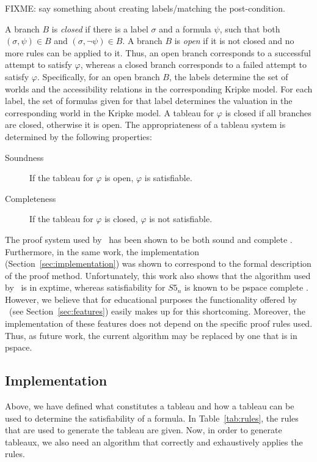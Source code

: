 FIXME: say something about creating labels/matching the post-condition.

A branch $B$ is {\em closed} if there is a label $\sigma$ and a formula
$\psi$, such that both $(\sigma, \psi) \in B$ and $(\sigma, \neg \psi)
\in B$. A branch $B$ is {\em open} if it is not closed and no more rules can be
applied to it. Thus, an open branch corresponds to a successful attempt to
satisfy $\varphi$, whereas a closed branch corresponds to a failed attempt to
satisfy $\varphi$. 
Specifically, for an open branch $B$, the labels determine the set of worlds
and the accessibility relations in the corresponding Kripke model. For each
label, the set of formulas given for that label determines the valuation in the
corresponding world in the Kripke model.
A tableau for $\varphi$ is closed if all branches are
closed, otherwise it is open. The appropriateness of a tableau system is
determined by the following properties:
\begin{description}
\item[Soundness] If the tableau for $\varphi$ is open, $\varphi$ is satisfiable.
\item[Completeness] If the tableau for $\varphi$ is closed, $\varphi$ is not
satisfiable.
\end{description}
The proof system used by \oops\ has been shown to be both sound and complete
\citep{valkenhoef2008}.  Furthermore, in the same work, the implementation
(Section~\ref{sec:implementation}) was
shown to correspond to the formal description of the proof method.
Unfortunately, this work also shows that the algorithm used by \oops\ is in
{\sc exptime}, whereas satisfiability for $S5_n$ is known to be {\sc pspace}
complete \citep{halpern1992}.
However, we believe that for educational purposes the functionality  offered
by \oops\ (see Section~\ref{sec:features}) easily makes up for this
shortcoming. Moreover, the implementation of these features does not depend on
the specific proof rules used. Thus, as future work, the current algorithm may
be replaced by one that is in {\sc pspace}.

\subsection{Implementation}

Above, we have defined what constitutes a tableau and how a tableau can be used
to determine the satisfiability of a formula. In Table~\ref{tab:rules}, the
rules that are used to generate the tableau are given. Now, in order to
generate tableaux, we also need an algorithm that correctly and exhaustively
applies the rules.

